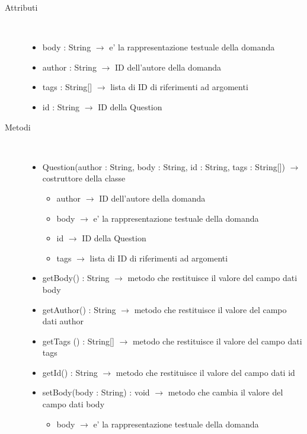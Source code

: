 \begin{description}
\item[Attributi] \hfill \\
\vspace{-7mm}
\begin{itemize}
	\item body : String $\rightarrow$ e' la rappresentazione testuale della domanda
	\item author : String $\rightarrow$ ID dell'autore della domanda
	\item tags  : String[] $\rightarrow$ lista di ID di riferimenti ad argomenti
	\item id : String $\rightarrow$ ID della Question
\end{itemize}

\item[Metodi] \hfill \\
\vspace{-7mm}
\begin{itemize}
	\item Question(author : String, body : String, id : String, tags : String[]) $\rightarrow$ costruttore della classe\begin{itemize}
		\item author $\rightarrow$ ID dell'autore della domanda
		\item body $\rightarrow$ e' la rappresentazione testuale della domanda
		\item id $\rightarrow$ ID della Question
		\item tags $\rightarrow$ lista di ID di riferimenti ad argomenti
	\end{itemize}
	
	\item getBody() : String $\rightarrow$ metodo che restituisce il valore del campo dati body
	\item getAuthor() : String $\rightarrow$ metodo che restituisce il valore del campo dati author
	\item getTags () : String[] $\rightarrow$ metodo che restituisce il valore del campo dati tags 
	\item getId() : String $\rightarrow$ metodo che restituisce il valore del campo dati id
	\item setBody(body : String) : void $\rightarrow$ metodo che cambia il valore del campo dati body\begin{itemize}
		\item body $\rightarrow$ e' la rappresentazione testuale della domanda
	\end{itemize}
	

\end{itemize}
\end{description}
